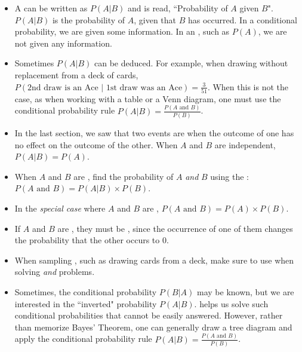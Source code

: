 \begin{itemize}

\item A  can be written as $P(A | B)$ and is read, ``Probability of $A$ given $B$".  $P(A|B)$ is the probability of $A$, given that $B$ has occurred.  In a conditional probability, we are given some information.  In an , such as $P(A)$, we are not given any information.

\item Sometimes $P(A | B)$ can be deduced.  For example, when drawing without replacement from a deck of cards, $P(\text{2nd draw is an Ace }| \text{ 1st draw was an Ace}) = \frac{3}{51}$.  When this is not the case, as when working with a table or a Venn diagram, one must use the conditional probability rule $P(A | B) = \frac{P(A\text{ and }B)}{P(B)}$.

\item In the last section, we saw that two events are  when the outcome of one has no effect on the outcome of the other.  When $A$ and $B$ are independent, $P(A | B) = P(A)$.

\item When $A$ and $B$  are , find the probability of $A$ \emph{and} $B$ using the :
$P(A \text{ and } B) = P(A | B)\times P(B)$.

\item In the \emph{special case} where $A$ and $B$ are , $P(A \text{ and } B) = P(A)\times P(B)$.

\item If $A$ and $B$ are , they must be , since the occurrence of one of them changes the probability that the other occurs to 0.

\item When sampling , such as drawing cards from a deck, make sure to use  when solving \emph{and} problems.  


\item Sometimes, the conditional probability $P(B|A)$ may be known, but we are interested in the ``inverted" probability $P(A|B)$.   helps us solve such conditional probabilities that cannot be easily answered.  However, rather than memorize Bayes' Theorem, one can generally draw a tree diagram and apply the conditional probability rule $P(A | B)=\frac{P(A\text{ and }B)}{P(B)}$. 


\end{itemize} 

